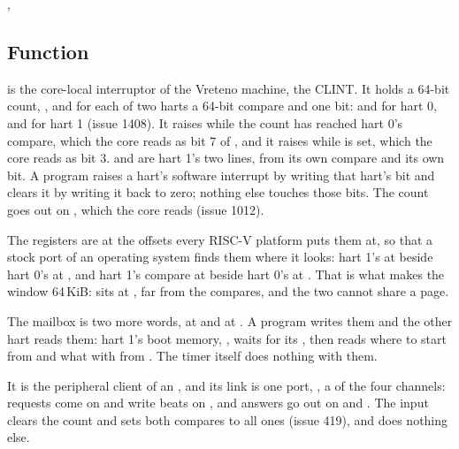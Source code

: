 
%
{, }

\subsection*{Function}

 is the core-local interruptor of the Vreteno machine, the
CLINT. It holds a 64-bit count, , and for each of two
harts a 64-bit compare and one bit:  and 
for hart 0,  and  for hart 1 (issue 1408).
It raises  while the count has reached hart 0's compare,
which the core reads as bit 7 of , and it raises 
while  is set, which the core reads as bit 3. 
and  are hart 1's two lines, from its own compare and its
own bit. A program raises a hart's software interrupt by writing that
hart's bit and clears it by writing it back to zero; nothing else
touches those bits. The count goes out on , which the core
reads (issue 1012).

The registers are at the offsets every RISC-V platform puts them at,
so that a stock port of an operating system finds them where it
looks: hart 1's  at  beside hart 0's at
, and hart 1's compare at  beside hart 0's
at . That is what makes the window 64\,KiB:
 sits at , far from the compares, and the
two cannot share a page.

The mailbox is two more words,  at  and
 at . A program writes them and the
other hart reads them: hart 1's boot memory, , waits
for its , then reads where to start from  and
what with from . The timer itself does nothing with them.

It is the peripheral client of an , and its link is one
port, , a  of the four channels: requests
come on  and write beats on , and answers
go out on  and . The input 
clears the count and sets both compares to all ones (issue 419), and
does nothing else.

